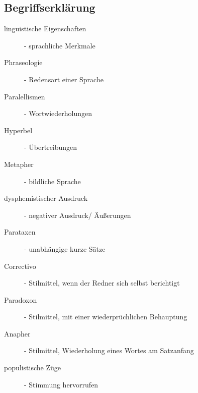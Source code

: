 \appendix






\subsection{Begriffserklärung}
\label{sec:Begriffserklärung}
\begin{description}
  \item[linguistische Eigenschaften] - sprachliche Merkmale
  \item[Phraseologie] - Redensart einer Sprache
  \item[Paralellismen] - Wortwiederholungen
  \item[Hyperbel] - Übertreibungen
  \item[Metapher] - bildliche Sprache
  \item[dysphemistischer Ausdruck] - negativer Ausdruck/ Äußerungen
  \item[Parataxen] - unabhängige kurze Sätze
  \item[Correctivo] - Stilmittel, wenn der Redner sich selbst berichtigt
  \item[Paradoxon] - Stilmittel, mit einer wiederprüchlichen Behauptung 
  \item[Anapher] - Stilmittel, Wiederholung eines Wortes am Satzanfang 
  \item[populistische Züge] - Stimmung hervorrufen  
\end{description}
\cleardoublepage

